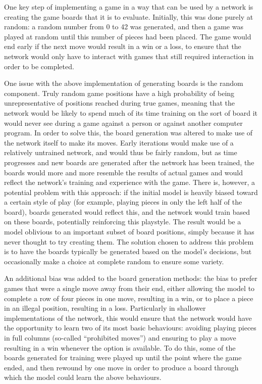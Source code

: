 \documentclass[12pt]{article}
\begin{document}
One key step of implementing a game in a way that can be used by a network is creating the game boards that it is to evaluate. Initially, this was done purely at random: a random number from 0 to 42 was generated, and then a game was played at random until this number of pieces had been placed. The game would end early if the next move would result in a win or a loss, to ensure that the network would only have to interact with games that still required interaction in order to be completed.

One issue with the above implementation of generating boards is the random component. Truly random game positions have a high probability of being unrepresentative of positions reached during true games, meaning that the network would be likely to spend much of its time training on the sort of board it would never see during a game against a person or against another computer program. In order to solve this, the board generation was altered to make use of the network itself to make its moves. Early iterations would make use of a relatively untrained network, and would thus be fairly random, but as time progresses and new boards are generated after the network has been trained, the boards would more and more resemble the results of actual games and would reflect the network’s training and experience with the game. There is, however, a potential problem with this approach: if the initial model is heavily biased toward a certain style of play (for example, playing pieces in only the left half of the board), boards generated would reflect this, and the network would train based on these boards, potentially reinforcing this playstyle. The result would be a model oblivious to an important subset of board positions, simply because it has never thought to try creating them. The solution chosen to address this problem is to have the boards typically be generated based on the model’s decisions, but occasionally make a choice at complete random to ensure some variety.

An additional bias was added to the board generation methods: the bias to prefer games that were a single move away from their end, either allowing the model to complete a row of four pieces in one move, resulting in a win, or to place a piece in an illegal position, resulting in a loss. Particularly in shallower implementations of the network, this would ensure that the network would have the opportunity to learn two of its most basic behaviours: avoiding playing pieces in full columns (so-called “prohibited moves”) and ensuring to play a move resulting in a win whenever the option is available. To do this, some of the boards generated for training were played up until the point where the game ended, and then rewound by one move in order to produce a board through which the model could learn the above behaviours.
\end{document}
